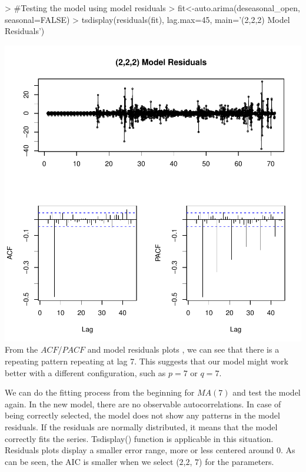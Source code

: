 \documentclass{article}
\begin{document}
\begin{Schunk}
\begin{Sinput}
> #Testing the model using model residuals
> fit<-auto.arima(deseasonal_open, seasonal=FALSE)
> tsdisplay(residuals(fit), lag.max=45, main='(2,2,2) Model Residuals')
\end{Sinput}
\end{Schunk}
\includegraphics{Report-018}
From the $ACF$/$PACF$ and model residuals plots , we can see that there is a repeating pattern repeating at lag 7. This suggests that our model might work better with a different configuration, such as $p = 7$ or $q = 7$. 

We can do the fitting process from the beginning for $MA(7)$ and test the model again. In the new model, there are no observable autocorrelations. In case of being correctly selected, the model does not show any patterns in the model residuals. If the residuals are normally distributed, it means that the model correctly fits the series. Tsdisplay() function is applicable in this situation. Residuals plots display a smaller error range, more or less centered around 0. As can be seen, the AIC is smaller when we select ($2$,$2$, $7$) for the parameters.
\end{document}
